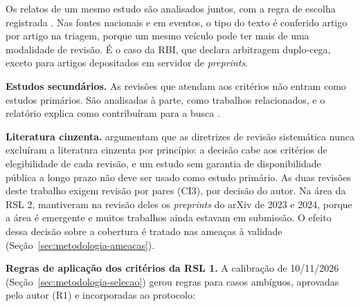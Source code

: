 Os relatos de um mesmo estudo são analisados juntos, com a regra de escolha
registrada \cite[quadro 1 e item 9]{page2021ee}. Nas fontes nacionais e em
eventos, o tipo do texto é conferido artigo por artigo na triagem, porque um
mesmo veículo pode ter mais de uma modalidade de revisão. É o caso da RBI, que
declara arbitragem duplo-cega, exceto para artigos depositados em servidor de
\textit{preprints}.

\textbf{Estudos secundários.} As revisões que atendam aos critérios não entram
como estudos primários. São analisadas à parte, como trabalhos relacionados, e
o relatório explica como contribuíram para a busca
\cite[item 7]{kitchenham2023segress}.

\textbf{Literatura cinzenta.}  argumentam que
as diretrizes de revisão sistemática nunca excluíram a literatura cinzenta por
princípio: a decisão cabe aos critérios de elegibilidade de cada revisão, e um
estudo sem garantia de disponibilidade pública a longo prazo não deve ser
usado como estudo primário. As duas revisões deste trabalho exigem revisão por
pares (CI3), por decisão do autor. Na área da RSL 2,  mantiveram na revisão deles os \textit{preprints} do arXiv de
2023 e 2024, porque a área é emergente e muitos trabalhos ainda estavam em
submissão. O efeito dessa decisão sobre a cobertura é tratado nas ameaças à
validade (Seção~\ref{sec:metodologia-ameacas}).

\textbf{Regras de aplicação dos critérios da RSL 1.} A calibração de
10/11/2026 (Seção~\ref{sec:metodologia-selecao}) gerou regras para casos
ambíguos, aprovadas pelo autor (R1) e incorporadas ao protocolo:

